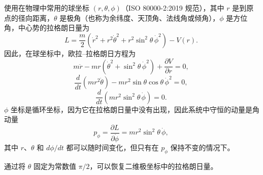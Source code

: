使用在物理中常用的球坐标 \((r, \theta, \phi)\)（ISO 80000-2:2019 规范），其中 \(r\) 是到原点的径向距离，\(\theta\) 是极角（也称为余纬度、天顶角、法线角或倾角），\(\phi\) 是方位角，中心势的拉格朗日量为
\[
L = \frac{m}{2} \left( \dot{r}^{2} + r^{2} \dot{\theta}^{2} + r^{2} \sin^{2} \theta \, \dot{\phi}^{2} \right) - V(r).~
\]
因此，在球坐标中，欧拉–拉格朗日方程为
\[
m \ddot{r} - mr(\dot{\theta}^{2} + \sin^{2} \theta \, \dot{\phi}^{2}) + \frac{\partial V}{\partial r} = 0,~
\]
\[
\frac{d}{dt} (mr^{2} \dot{\theta}) - mr^{2} \sin \theta \cos \theta \, \dot{\phi}^{2} = 0,~
\]
\[
\frac{d}{dt} (mr^{2} \sin^{2} \theta \, \dot{\phi}) = 0.~
\]
\(\phi\) 坐标是循环坐标，因为它在拉格朗日量中没有出现，因此系统中守恒的动量是角动量
\[
p_{\phi} = \frac{\partial L}{\partial \dot{\phi}} = mr^{2} \sin^{2} \theta \, \dot{\phi},~
\]
其中 \(r\)、\(\theta\) 和 \(d\phi/dt\) 都可以随时间变化，但只有在 \(p_{\phi}\) 保持不变的情况下。

通过将 \(\theta\) 固定为常数值 \(\pi/2\)，可以恢复二维极坐标中的拉格朗日量。
